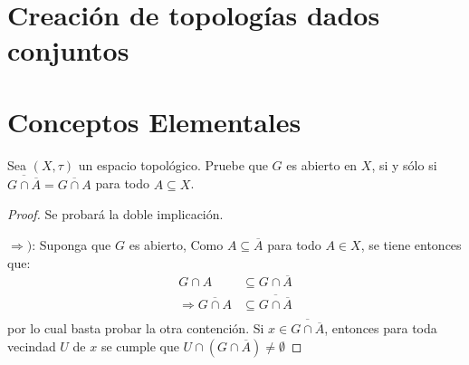 \documentclass[12pt]{report}
\theoremstyle{largebreak}
\newcommand{\Cls}[1]{\ensuremath{\overline{#1}}}
\begin{document}
    \setcounter{section}{2}

    \section{Creación de topologías dados conjuntos}

    \begin{excer}
        
    \end{excer}

     \section{Conceptos Elementales}

     \begin{excer}
        Sea $(X,\tau)$ un espacio topológico. Pruebe que $G$ es abierto en $X$, si y sólo si $\Cls{G\cap\Cls{A}}=\Cls{G\cap A}$ para todo $A\subseteq X$.
     \end{excer}

    \begin{proof}
        Se probará la doble implicación.

        $\Rightarrow)$: Suponga que $G$ es abierto, Como $A\subseteq \Cls{A}$ para todo $A\in X$, se tiene entonces que:
        \begin{equation*}
            \begin{split}
                G\cap A&\subseteq G\cap \Cls{A}\\
                \Rightarrow \Cls{G\cap A}&\subseteq \Cls{G\cap \Cls{A}} \\
            \end{split}
        \end{equation*}
        por lo cual basta probar la otra contención. Si $x\in\Cls{G\cap \Cls{A}}$, entonces para toda vecindad $U$ de $x$ se cumple que $U\cap (G\cap \Cls{A})\neq\emptyset$
    \end{proof}

    \begin{excer}
        
    \end{excer}
\end{document}
